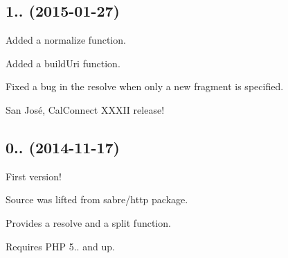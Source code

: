 \subsection*{1.. (2015-\/01-\/27) }


\begin{DoxyItemize}
\item Added a {\ttfamily normalize} function.
\item Added a {\ttfamily build\+Uri} function.
\item Fixed a bug in the {\ttfamily resolve} when only a new fragment is specified.
\end{DoxyItemize}

San José, Cal\+Connect X\+X\+X\+II release!

\subsection*{0.. (2014-\/11-\/17) }


\begin{DoxyItemize}
\item First version!
\item Source was lifted from sabre/http package.
\item Provides a {\ttfamily resolve} and a {\ttfamily split} function.
\item Requires P\+HP 5.. and up. 
\end{DoxyItemize}